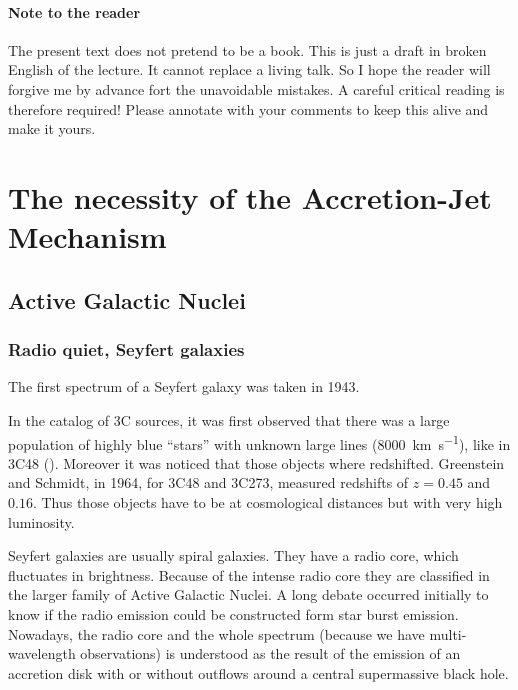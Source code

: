 \documentclass[10pt,a4paper,english]{article}
\begin{document}

\paragraph{Note to the reader}
The present text does not pretend to be a book. This is just a draft in broken
English of the lecture. It cannot replace a living talk. So I hope the reader
will forgive me by advance fort the unavoidable mistakes. A careful critical
reading is therefore required! Please annotate with your comments to keep this
alive and make it yours.

\tableofcontents

\newpage
{} %


\section{The necessity of the Accretion-Jet Mechanism}

\subsection{Active Galactic Nuclei}

\subsubsection{Radio quiet, Seyfert galaxies}

The first spectrum of a Seyfert galaxy was taken in 1943.


In the catalog of 3C sources, it was first observed that there was a large
population of highly blue “stars” with unknown large lines
(\SI{8000}{\km\per\s}), like in 3C48 (\cite{Matthews1960}).
Moreover it was noticed that those objects where redshifted. Greenstein and
Schmidt, in 1964, for 3C48 and 3C273, measured redshifts of $z=0.45$ and
$0.16$. Thus those objects have to be at cosmological distances but with very
high luminosity.


Seyfert galaxies are usually spiral galaxies. They have a radio core, which
fluctuates in brightness. Because of the intense radio core they are classified
in the larger family of Active Galactic Nuclei. A long debate occurred
initially to know if the radio emission could be constructed form star burst
emission. Nowadays, the radio core and the whole spectrum (because we have
multi-wavelength observations) is understood as the result of the emission of
an accretion disk with or without outflows around a central supermassive black
hole.
\end{document}
